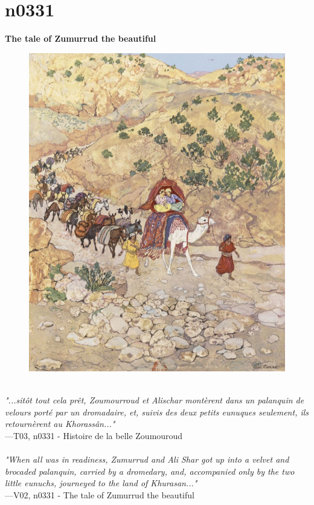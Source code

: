 \documentclass[../Carre_nights.tex]{subfiles}
\begin{document}
\newpage

\section{n0331}
\textbf{\Large{The tale of Zumurrud the beautiful}} \\

\begin{figure}[ht]
\centering
\includegraphics[height=\figsize]{illustrations/volume_3/T03, n0331 - Histoire de la belle Zoumouroud.jpg}
\end{figure}

\textit{\\
"...sitôt tout cela prêt, Zoumourroud et Alischar montèrent dans un palanquin de velours porté par un dromadaire, et, suivis des deux petits eunuques seulement, ils retournèrent au Khorassân..."} \\
—T03, n0331 - Histoire de la belle Zoumouroud \\~\\
\textit{"When all was in readiness, Zumurrud and Ali Shar got up into a velvet and brocaded palanquin, carried by a dromedary, and, accompanied only by the two little eunuchs, journeyed to the land of Khurasan..."} \\
—V02, n0331 - The tale of Zumurrud the beautiful
\end{document}
